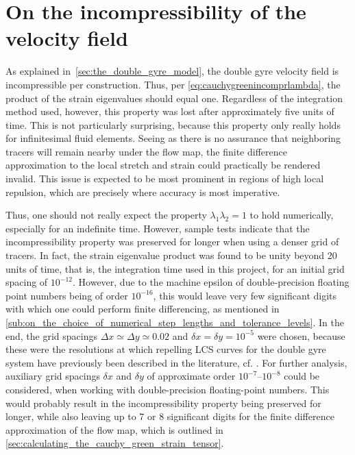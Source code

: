 \section{On the incompressibility of the velocity field}
\label{sec:on_the_incompressibility_of_the_velocity_field}

As explained in~\cref{sec:the_double_gyre_model}, the double gyre velocity field
is incompressible per construction. Thus, per
\cref{eq:cauchygreenincomprlambda}, the product of the strain eigenvalues
should equal one. Regardless of the integration method used, however, this
property was lost after approximately five units of time. This is not
particularly surprising, because this property only really holds for
infinitesimal fluid elements. Seeing as there is no assurance that neighboring
tracers will remain nearby under the flow map, the finite difference
approximation to the local stretch and strain could practically be rendered
invalid. This issue is expected to be most prominent in regions of high local
repulsion, which are precisely where accuracy is most imperative.

Thus, one should not really expect the property $\lambda_{1}\lambda_{2}=1$ to
hold numerically, especially for an indefinite time. However, sample tests
indicate that the incompressibility property was preserved for longer when
using a denser grid of tracers. In fact, the strain eigenvalue product was
found to be unity beyond 20 units of time, that is, the integration time used in
this project, for an initial grid spacing of $10^{-12}$. However, due to the
machine epsilon of double-precision floating point numbers being of order
$10^{-16}$, this would leave very few significant digits with which one could
perform finite differencing, as mentioned in
\cref{sub:on_the_choice_of_numerical_step_lengths_and_tolerance_levels}.
In the end, the grid spacings $\Delta{x}\simeq\Delta{y}\simeq0.02$
and $\delta{x}=\delta{y}=10^{-5}$ were chosen, because these were the
resolutions at which repelling LCS curves for the double
gyre system have previously been described in the literature, cf.
\textcite{farazmand2012computing}. For further analysis, auxiliary grid spacings
$\delta{x}$ and $\delta{y}$ of approximate order $10^{-7}$--$10^{-8}$ could be
considered, when working with double-precision floating-point numbers. This
would probably result in the incompressibility property being preserved for
longer, while also leaving up to 7 or 8 significant digits for the finite
difference approximation of the flow map, which is outlined in
\cref{sec:calculating_the_cauchy_green_strain_tensor}.

